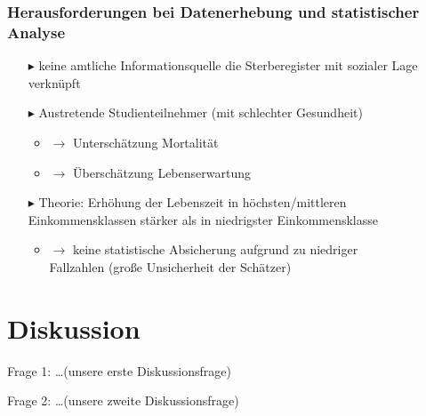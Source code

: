 \documentclass{beamer}
\begin{document}
\begin{frame}
\frametitle{Herausforderungen bei Datenerhebung und statistischer Analyse}
\begin{itemize}
   \item [$\blacktriangleright$] keine amtliche Informationsquelle die Sterberegister mit sozialer Lage verknüpft
   \item [$\blacktriangleright$] Austretende Studienteilnehmer (mit schlechter Gesundheit)
      \begin{itemize} 
         \item $\rightarrow$ Unterschätzung Mortalität
         \item $\rightarrow$ Überschätzung Lebenserwartung
      \end{itemize}
   \item [$\blacktriangleright$]Theorie: Erhöhung der Lebenszeit in höchsten/mittleren Einkommensklassen stärker als in niedrigster Einkommensklasse
      \begin{itemize}
         \item $\rightarrow$ keine statistische Absicherung aufgrund zu niedriger \\ \hspace{0.4cm} Fallzahlen (große Unsicherheit der Schätzer)
      \end{itemize}
 \end{itemize}






\end{frame}











\section{Diskussion}
\begin{frame}
	\begin{block}{Frage 1:}
		 \dots (unsere erste Diskussionsfrage)
	\end{block}
	\pause  %
	\begin{block}{Frage 2:}
		 \dots (unsere zweite Diskussionsfrage)
	\end{block}
\end{frame}
\end{document}
